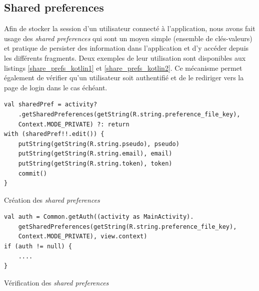 \subsection{Shared preferences}
Afin de stocker la session d'un utilisateur connecté à l'application, nous avons fait usage des \textit{shared preferences} qui sont un moyen simple (ensemble de clés-valeurs) et pratique de persister des information dans l'application et d'y accéder depuis les différents fragments. Deux exemples de leur utilisation sont disponibles aux listings \ref{share_prefs_kotlin1} et \ref{share_prefs_kotlin2}. Ce mécanisme permet également de vérifier qu'un utilisateur soit authentifié et de le rediriger vers la page de login dans le cas échéant.
\bigbreak
\begin{code}
    \begin{verbatim}
val sharedPref = activity?
    .getSharedPreferences(getString(R.string.preference_file_key), 
    Context.MODE_PRIVATE) ?: return
with (sharedPref!!.edit()) {
    putString(getString(R.string.pseudo), pseudo)
    putString(getString(R.string.email), email)
    putString(getString(R.string.token), token)
    commit()
}
    \end{verbatim}
    \caption{Création des \textit{shared preferences}}
    \label{share_prefs_kotlin1}
\end{code}
\bigbreak

\bigbreak
\begin{code}
    \begin{verbatim}
val auth = Common.getAuth((activity as MainActivity).
    getSharedPreferences(getString(R.string.preference_file_key),
    Context.MODE_PRIVATE), view.context)
if (auth != null) {
    ....
}
    \end{verbatim}
    \caption{Vérification des \textit{shared preferences}}
    \label{share_prefs_kotlin2}
\end{code}
\bigbreak

